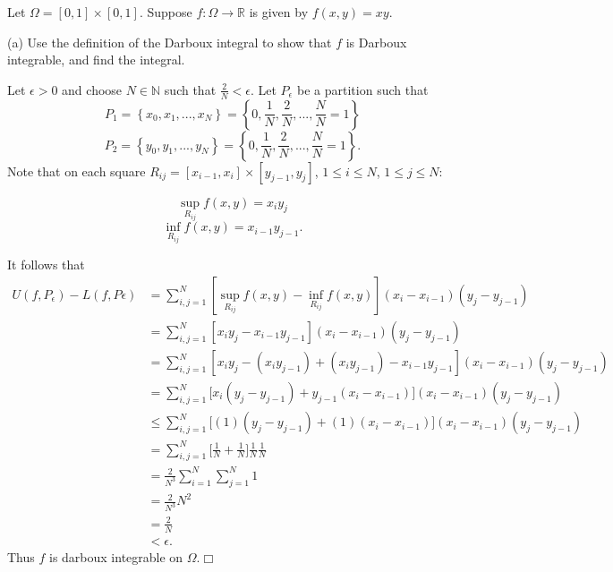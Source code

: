 \documentclass[11pt]{article}
\begin{document}
\vspace{.5in}

\noindent {\bf [5]} Let $\Omega=[0,1]\times[0,1]$. Suppose $f:\Omega\rightarrow\mathbb{R}$ is given by $f(x,y)=xy$.

\vspace{.2in}

\noindent (a) Use the definition of the Darboux integral to show that $f$ is Darboux integrable, and find the integral.

\vspace{.2in}

\noindent Let $\epsilon>0$ and choose $N\in\mathbb{N}$ such that $\frac{2}{N}<\epsilon$. Let $P_\epsilon$ be a partition such that 
\[
P_1=\left\{x_0,x_1,...,x_N\right\}=\left\{0,\frac{1}{N},\frac{2}{N},...,\frac{N}{N}=1\right\}
\]
\[
P_2=\left\{y_0,y_1,...,y_N\right\}=\left\{0,\frac{1}{N},\frac{2}{N},...,\frac{N}{N}=1\right\}.
\]
\noindent Note that on each square $R_{ij}=[x_{i-1},x_i]\times[y_{j-1},y_j]$, $1\leq i\leq N$, $1\leq j\leq N$:
\vspace{.1in}

\[
\sup\limits_{R_{ij}}f(x,y)=x_iy_j
\]
\[
\inf\limits_{R_{ij}}f(x,y)=x_{i-1}y_{j-1}.
\]

\vspace{.2in}

\noindent It follows that
\begin{align*}
U(f,P_\epsilon)-L(f,P\epsilon)&=\sum\limits_{i,j=1}^N\left[\sup\limits_{R_{ij}}f(x,y)-\inf\limits_{R_{ij}}f(x,y)\right]\left(x_i-x_{i-1}\right)\left(y_j-y_{j-1}\right)\\&=\sum\limits_{i,j=1}^N\left[x_iy_j-x_{i-1}y_{j-1}\right]\left(x_i-x_{i-1}\right)\left(y_j-y_{j-1}\right)\\&=\sum\limits_{i,j=1}^N\left[x_iy_j-\left(x_iy_{j-1}\right)+\left(x_iy_{j-1}\right)-x_{i-1}y_{j-1}\right]\left(x_i-x_{i-1}\right)\left(y_j-y_{j-1}\right)\\&=\sum\limits_{i,j=1}^N\Big[x_i\left(y_j-y_{j-1}\right)+y_{j-1}\left(x_i-x_{i-1}\right)\Big]\left(x_i-x_{i-1}\right)\left(y_j-y_{j-1}\right)\\&\leq \sum\limits_{i,j=1}^N\Big[(1)\left(y_j-y_{j-1}\right)+(1)\left(x_i-x_{i-1}\right)\Big]\left(x_i-x_{i-1}\right)\left(y_j-y_{j-1}\right)\\&=\sum\limits_{i,j=1}^N\Big[\frac{1}{N}+\frac{1}{N}\Big]\frac{1}{N}\frac{1}{N}\\&=\frac{2}{N^3}\sum\limits_{i=1}^N\sum\limits_{j=1}^N1\\&=\frac{2}{N^3}N^2\\&=\frac{2}{N}\\&<\epsilon.
\end{align*}
\noindent Thus $f$ is darboux integrable on $\Omega$.\hfill $\Box$
\end{document}
